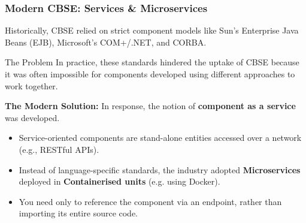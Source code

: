 \documentclass[xcolor=table]{beamer}
\begin{document}
\begin{frame}
    \frametitle{Modern CBSE: Services \& Microservices}
    \small
    Historically, CBSE relied on strict component models like Sun's Enterprise Java Beans (EJB), Microsoft's COM+/.NET, and CORBA.
    
    \vspace{0.2cm}
    \begin{alertblock}{The Problem}
        In practice, these standards hindered the uptake of CBSE because it was often impossible for components developed using different approaches to work together.
    \end{alertblock}
    
    \vspace{0.2cm}
    \textbf{The Modern Solution:}
    In response, the notion of \textbf{component as a service} was developed. 
    \begin{itemize}
        \item Service-oriented components are stand-alone entities accessed over a network (e.g., RESTful APIs).
        \item Instead of language-specific standards, the industry adopted \textbf{Microservices} deployed in \textbf{Containerised units} (e.g. using Docker).
        \item You need only to reference the component via an endpoint, rather than importing its entire source code.
    \end{itemize}
\end{frame}
\end{document}
